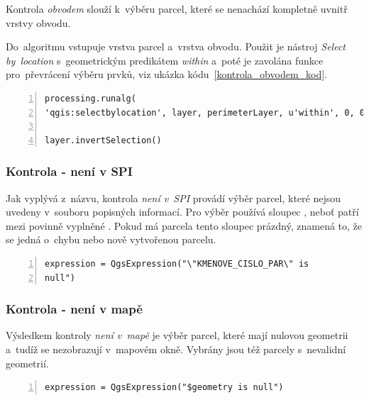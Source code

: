Kontrola \textit{obvodem} slouží k~výběru parcel, které se nenachází
kompletně uvnitř vrstvy obvodu.

Do~algoritmu vstupuje vrstva parcel a~vrstva obvodu. Použit je nástroj
\textit{Select by~location} s~geometrickým predikátem \textit{within}
a~poté je zavolána funkce pro~převrácení výběru prvků, viz ukázka
kódu~\ref{kontrola_obvodem_kod}.

{\scriptsize
\begin{lstlisting}[style=python, caption={Kontrola \textit{obvodem}~–
výběr prvků}, captionpos=b, label=kontrola_obvodem_kod,
backgroundcolor = \color{light-gray}, numbers=left] processing.runalg(
'qgis:selectbylocation', layer, perimeterLayer, u'within', 0, 0)

layer.invertSelection()
\end{lstlisting}}

\subsubsection{Kontrola - není v SPI}
\label{kontrola_neni_v_spi}

Jak vyplývá z~názvu, kontrola \textit{není v~SPI} provádí výběr
parcel, které nejsou uvedeny v~souboru popisných informací. Pro výběr
používá sloupec \texttt{}, neboť patří
mezi povinně vyplněné \citep{struktura_vfk}. Pokud má parcela tento
sloupec prázdný, znamená to, že se jedná o~chybu nebo nově vytvořenou
parcelu.

{\scriptsize
\begin{lstlisting}[style=python, caption={Kontrola \textit{není
v~SPI}~– vzorec pro~výběr prvků}, captionpos=b,
label=kontrola_spi_kod, backgroundcolor = \color{light-gray},
numbers=left] expression = QgsExpression("\"KMENOVE_CISLO_PAR\" is
null")
\end{lstlisting}}

\subsubsection{Kontrola - není v mapě}
\label{kontrola_neni_v_mape}

Výsledkem kontroly \textit{není v~mapě} je výběr parcel, které mají
nulovou geometrii a~tudíž se nezobrazují v~mapovém okně. Vybrány jsou
též parcely s~nevalidní geometrií.

{\scriptsize
\begin{lstlisting}[style=python, caption={Kontrola \textit{není
v~mapě}~– vzorec pro~výběr prvků}, captionpos=b,
label=kontrola_mapa_kod, backgroundcolor = \color{light-gray},
numbers=left] expression = QgsExpression("$geometry is null")
\end{lstlisting}}

